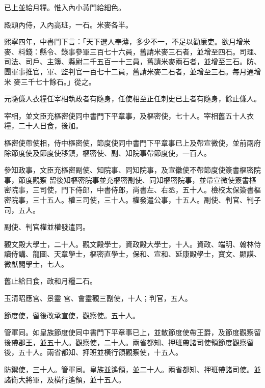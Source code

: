 \begin{pinyinscope}
 已上並給月糧。惟入內小黃門給細色。



 殿頭內侍，入內高班，一石。米麥各半。



 熙寧四年，中書門下言：「天下選人奉薄，多少不一，不足以勸廉吏。欲月增米麥、料錢：縣令、錄事參軍三百七十六員，舊請米麥三石者，並增至四石。司理、司法、司戶、主簿、縣尉二千五百一十三員，舊請米麥兩石者，並增至三石。防、團軍事推官，軍、監判官一百七十二員，舊請米麥二石者，並增至三石。每月通增米
 麥三千七十餘石。」從之。



 元隨傔人衣糧任宰相執政者有隨身，任使相至正任刺史已上者有隨身，餘止傔人。



 宰相，並文臣充樞密使同中書門下平章事，及樞密使，七十人。宰相舊五十人衣糧，二十人日食，後加。



 樞密使帶使相，侍中樞密使，節度使同中書門下平章事已上及帶宣微使，並前兩府除節度使及節度使移鎮，樞密使、副、知院事帶節度使，一百人。



 參知政事，文臣充樞密副使、知院事、同知院事，及宣徽使不帶節度使簽書樞密院事，節度觀察
 留後知樞密院事並充樞密副使、同知樞密院事，並帶宣微使簽書樞密院事，三司使，門下侍郎，中書侍郎，尚書左、右丞，五十人。檢校太保簽書樞密院事，三十五人。權三司使，三十人。權發遣公事，十五人。副使、判官、判子司，五人。



 副使、判官權並權發遣同。



 觀文殿大學士，二十人。觀文殿學士，資政殿大學士，十人。資政、端明、翰林侍讀侍講、龍圖、天章學士，樞密直學士，保和、宣和、延康殿學士，寶文、顯謨、微猷閣學士，七人。



 舊止給日食，政和月糧二石。



 玉清昭應宮、景靈
 宮、會靈觀三副使，十人；判官，五人。



 節度使，留後改承宣使，觀察使。五十人。



 管軍同。如皇族節度使同中書門下平章事已上，並散節度使帶王爵，及節度觀察留後帶郡王，並五十人。觀察使，二十人。兩省都知、押班帶諸司使領節度觀察留後，五十人。兩省都知、押班並橫行領觀察使，十五人。



 防禦使，三十人。管軍同。皇族並遙領，並二十人。兩省都知、押班帶諸司使。並諸衛大將軍，及橫行遙領，並十五人。




\end{pinyinscope}
